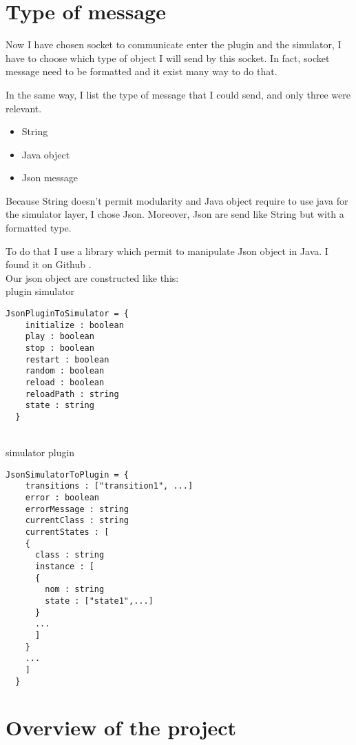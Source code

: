 \section{Type of message}

Now I have chosen socket to communicate enter the plugin and the simulator, I have to choose which type of object I will send by this socket. In fact, socket message need to be formatted and it exist many way to do that.

In the same way, I list the type of message that I could send, and only three were relevant.

\begin{itemize}
\item String
\item Java object
\item Json message
\end{itemize}

Because String doesn't permit modularity and Java object require to use java for the simulator layer, I chose Json. Moreover, Json are send like String but with a formatted type.

To do that I use a library which permit to manipulate Json object in Java. I found it on Github \cite{json}.
~\\

Our json object are constructed like this:
~\\

plugin \overrightarrow{} simulator
\begin{lstlisting}[style=json]
  JsonPluginToSimulator = {
    initialize : boolean
    play : boolean
    stop : boolean
    restart : boolean
    random : boolean
    reload : boolean
    reloadPath : string
    state : string
  }
\end{lstlisting}

~\\

simulator \overrightarrow{} plugin
\begin{lstlisting}[style=json]
  JsonSimulatorToPlugin = {
    transitions : ["transition1", ...]
    error : boolean
    errorMessage : string
    currentClass : string
    currentStates : [
    {
      class : string
      instance : [
      {
        nom : string
        state : ["state1",...]
      }
      ...
      ]
    }
    ...
    ]
  }

\end{lstlisting}


\section{Overview of the project}

